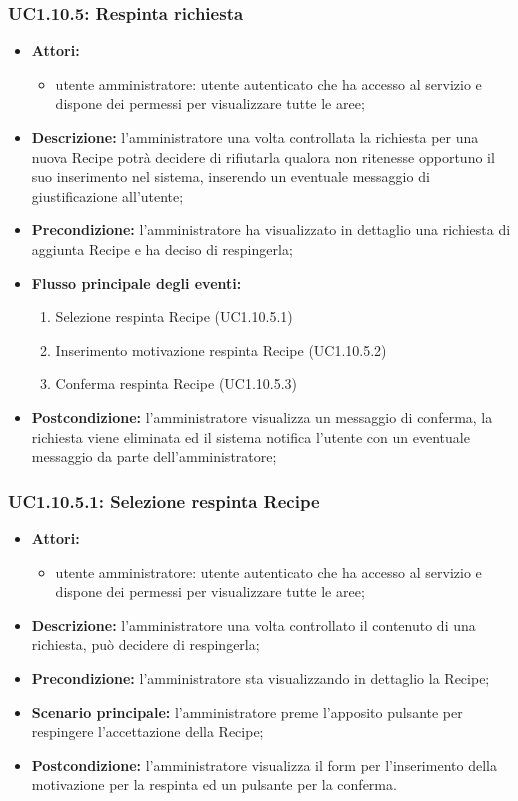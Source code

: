 \subsubsection{UC1.10.5: Respinta richiesta}
	\begin{itemize}
		\item \textbf{Attori:}
		\begin{itemize}
			\item utente amministratore: utente autenticato che ha accesso al servizio e dispone dei permessi per visualizzare tutte le aree;
		\end{itemize}
		\item \textbf{Descrizione:} l'amministratore una volta controllata la richiesta per una nuova Recipe potrà decidere di rifiutarla qualora non ritenesse opportuno il suo inserimento nel sistema, inserendo un eventuale messaggio di giustificazione all'utente;
		\item \textbf{Precondizione:} l'amministratore ha visualizzato in dettaglio una richiesta di aggiunta Recipe e ha deciso di respingerla;
		\item \textbf{Flusso principale degli eventi:}
		\begin{enumerate}
			\item Selezione respinta Recipe (UC1.10.5.1)
			\item Inserimento motivazione respinta Recipe (UC1.10.5.2)
			\item Conferma respinta Recipe (UC1.10.5.3)
		\end{enumerate}
		\item \textbf{Postcondizione:} l'amministratore visualizza un messaggio di conferma, la richiesta viene eliminata ed il sistema notifica l'utente con un eventuale messaggio da parte dell'amministratore;
	\end{itemize}

\subsubsection{UC1.10.5.1: Selezione respinta Recipe}
\begin{itemize}
	\item \textbf{Attori:}
	\begin{itemize}
		\item utente amministratore: utente autenticato che ha accesso al servizio e dispone dei permessi per visualizzare tutte le aree;
	\end{itemize}
	\item \textbf{Descrizione:} l'amministratore una volta controllato il contenuto di una richiesta, può decidere di respingerla;
	\item \textbf{Precondizione:} l'amministratore sta visualizzando in dettaglio la Recipe;
	\item \textbf{Scenario principale:} l'amministratore preme l'apposito pulsante per respingere l'accettazione della Recipe;
	\item \textbf{Postcondizione:} l'amministratore visualizza il form per l'inserimento della motivazione per la respinta ed un pulsante per la conferma.
\end{itemize}

